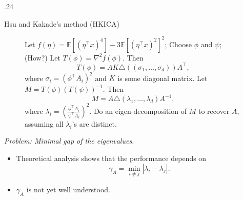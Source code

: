 \documentclass[final]{beamer} %
\newcommand{\EEp}[1]{\mathbb{E}\left[#1\right]}
\begin{document}
\begin{frame}[c]
\begin{columns}[t,totalwidth=\textwidth]
\begin{column} {.24\textwidth}
\begin{block}{Hsu and Kakade's method (HKICA)}
			\begin{figure}
			\begin{algorithmic}[1]
				\STATE Let $f(\eta) = \EEp{(\eta^{\top}x)^4} - 3 \EEp{(\eta^{\top}x)^2}^2$;
				\STATE  Choose $\phi$ and $\psi$; (How?)
				\STATE Let $T(\phi) = \nabla^2 f(\phi)$. Then 
					\[T(\phi) = AK \triangle\left( (\sigma_1,\ldots,  \sigma_d)\right)A^{\top},
					\]
					where $\sigma_i = \left(\phi^{\top}A_i\right)^2$ and $K$ is some diagonal matrix.
				\STATE Let $M = T(\phi)(T(\psi))^{-1}$. Then 
					\[M = A \triangle \left( \lambda_1, \ldots, \lambda_d \right) A^{-1},
					\]
					where $\lambda_i = \left(\frac{\phi^{\top}A_i}{\psi^{\top}A_i}\right)^2$.
				\STATE Do an eigen-decomposition of $M$ to recover $A$, assuming all $\lambda_i$'s are distinct.
			\end{algorithmic}
			\end{figure}
			\vspace{1cm}
			{\it\large{Problem: Minimal gap of the eigenvalues.}}
			\begin{itemize}
				\item Theoretical analysis shows that the performance depends on 
					\[
					\gamma_A = \min_{i\neq j} \left\vert \lambda_i - \lambda_j\right \vert.
					\]
				\vspace{-1cm}
				\item $\gamma_A$ is not yet well understood.
			\end{itemize}
		\end{block}
	\end{column}


\end{columns}
\end{frame}
\end{document}
